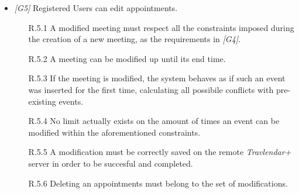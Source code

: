 \begin{itemize}
	\item \textit{[G5]} Registered Users can edit appointments.
		 \begin{itemize}
		 	\item  [R.5.1] A modified meeting must respect all the constraints imposed during the creation of a new meeting, as the requirements in \textit{[G4]}.
		 	\item [R.5.2] A meeting can be modified up until its end time.
		 	\item [R.5.3] If the meeting is modified, the system behaves as if such an event was inserted for the first time, calculating all possibile conflicts with pre-existing events.
		 	\item [R.5.4] No limit actually exists on the amount of times an event can be modified within the aforementioned constraints.
		 	\item [R.5.5] A modification must be correctly saved on the remote \textit{Travlendar+} server in order to be succesful and completed.
		 	\item [R.5.6] Deleting an appointments must belong to the set of modifications.
		 \end{itemize}



\end{itemize}
